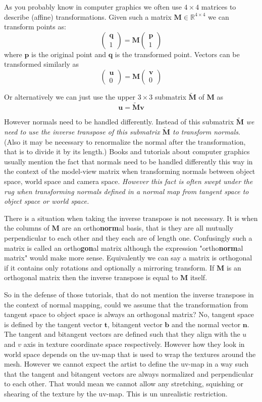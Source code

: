\documentclass{article}
\newcommand{\R}{\mathbb{R}}
\newcommand{\vctr}[1]{\mathbf{#1}}
\newcommand{\point}[1]{\mathbf{#1}}
\newcommand{\nrml}[1]{\mathbf{#1}}
\newcommand{\mat}[1]{\mathbf{#1}}
\newcommand{\tangent}{\vctr{t}}
\newcommand{\bitangent}{\vctr{b}}
\newcommand{\normal}{\nrml{n}}
\newcommand{\colvec}[1]{\begin{pmatrix}#1\end{pmatrix}}
\begin{document}
As you probably know in computer graphics we often use \(4\times 4\) matrices to describe (affine) transformations. Given such a matrix \(\mat{M} \in \R^{4\times 4}\) we can transform points as:
\[
\colvec{\point{q} \\ 1} = \mat{M} \colvec{\point{p} \\ 1}
\]
where \(\point{p}\) is the original point and \(\point{q}\) is the transformed point. Vectors can be transformed similarly as 
\[
\colvec{\vctr{u} \\ 0} = \mat{M} \colvec{\vctr{v} \\ 0}
\]

Or alternatively we can just use the upper \(3\times 3\) submatrix \(\mat{\tilde{M}}\) of \(\mat{M}\) as
\[
\vctr{u} = \mat{\tilde{M}}\vctr{v}
\]

However normals need to be handled differently. Instead of this submatrix \(\mat{\tilde{M}}\) \emph{we need to use the inverse transpose of this submatrix \(\mat{\tilde{M}}\) to transform normals}. (Also it may be necessary to renormalize the normal after the transformation, that is to divide it by its length.) Books and tutorials about computer graphics usually mention the fact that normals need to be handled differently this way in the context of the model-view matrix when transforming normals between object space, world space and camera space. \emph{However this fact is often swept under the rug when transforming normals defined in a normal map from tangent space to object space or world space.} 

There is a situation when taking the inverse transpose is not necessary. It is when the columns of \(\mat{M}\) are an ortho\textbf{norm}al basis, that is they are all mutually perpendicular to each other and they each are of length one. Confusingly such a matrix is called an ortho\textbf{gon}al matrix although the expression "ortho\textbf{norm}al matrix" would make more sense. Equivalently we can say a matrix is orthogonal if it contains only rotations and optionally a mirroring transform. If \(\mat{M}\) is an orthogonal matrix then the inverse transpose is equal to \(\mat{M}\) itself. 

So in the defense of those tutorials, that do not mention the inverse transpose in the context of normal mapping, could we assume that the transformation from tangent space to object space is always an orthogonal matrix? No, tangent space is defined by the tangent vector \(\tangent\), bitangent vector \(\bitangent\) and the normal vector \(\normal\). The tangent and bitangent vectors are defined such that they align with the \(u\) and \(v\) axis in texture coordinate space respectively. However how they look in world space depends on the uv-map that is used to wrap the textures around the mesh. However we cannot expect the artist to define the uv-map in a way such that the tangent and bitangent vectors are always normalized and perpendicular to each other. That would mean we cannot allow any stretching, squishing or shearing of the texture by the uv-map. This is un unrealistic restriction. 
\end{document}

